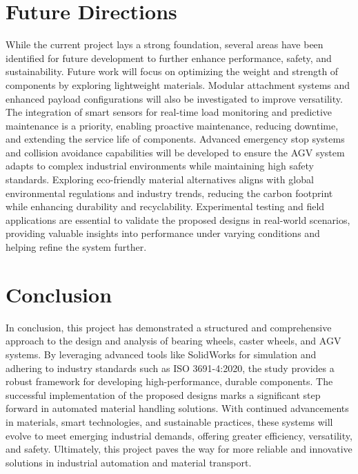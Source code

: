 \documentclass[main]{subfiles}
\begin{document}
\section{Future Directions}
While the current project lays a strong foundation, several areas have been identified for future development to further enhance performance, safety, and sustainability. Future work will focus on optimizing the weight and strength of components by exploring lightweight materials. Modular attachment systems and enhanced payload configurations will also be investigated to improve versatility. The integration of smart sensors for real-time load monitoring and predictive maintenance is a priority, enabling proactive maintenance, reducing downtime, and extending the service life of components. Advanced emergency stop systems and collision avoidance capabilities will be developed to ensure the AGV system adapts to complex industrial environments while maintaining high safety standards. Exploring eco-friendly material alternatives aligns with global environmental regulations and industry trends, reducing the carbon footprint while enhancing durability and recyclability. Experimental testing and field applications are essential to validate the proposed designs in real-world scenarios, providing valuable insights into performance under varying conditions and helping refine the system further.

\section{Conclusion}
In conclusion, this project has demonstrated a structured and comprehensive approach to the design and analysis of bearing wheels, caster wheels, and AGV systems. By leveraging advanced tools like SolidWorks for simulation and adhering to industry standards such as ISO 3691-4:2020, the study provides a robust framework for developing high-performance, durable components. The successful implementation of the proposed designs marks a significant step forward in automated material handling solutions. With continued advancements in materials, smart technologies, and sustainable practices, these systems will evolve to meet emerging industrial demands, offering greater efficiency, versatility, and safety. Ultimately, this project paves the way for more reliable and innovative solutions in industrial automation and material transport.
\end{document}
